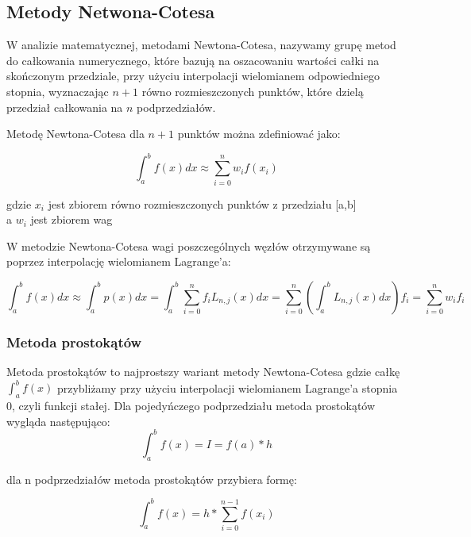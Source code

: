 \documentclass[12pt,twoside]{article}
\begin{document}
\subsection{Metody Netwona-Cotesa}

W analizie matematycznej, metodami Newtona-Cotesa, nazywamy grupę metod do całkowania numerycznego, które bazują na oszacowaniu wartości całki na skończonym przedziale, przy użyciu interpolacji wielomianem odpowiedniego stopnia, wyznaczając $n+1$ równo rozmieszczonych punktów, które dzielą przedział całkowania na $n$ podprzedziałów.
\cite{wikipedia}

Metodę Newtona-Cotesa dla $n+1$ punktów  można zdefiniować jako:

\begin{equation}
\int_a^b f(x)dx \approx \sum_{i=0}^n w_i f(x_i)
\label{Eq:rownanie}
\end{equation}


gdzie 
$x_i$ jest zbiorem równo rozmieszczonych punktów z przedziału [a,b]\\
a $w_i$ jest zbiorem wag


W metodzie Newtona-Cotesa wagi poszczególnych węzłów otrzymywane są poprzez interpolację wielomianem Lagrange'a:

\begin{equation}
\int_a^b f(x) dx \approx \int_a^b p(x) dx = \int_a^b \sum_{i=0}^{n} f_i L_{n,j}(x) dx = \sum_{i=0}^{n}(\int_a^b L_{n,j}(x)dx)f_i = \sum_{i=0}^{n} w_i f_i
\label{Eq:rownanie}
\end{equation}

\cite{web}

\clearpage	

\subsubsection{Metoda prostokątów}

Metoda prostokątów to najprostszy wariant metody Newtona-Cotesa gdzie całkę $\int_a^b f(x)$ przybliżamy przy użyciu interpolacji wielomianem Lagrange'a stopnia 0, czyli funkcji stałej.
Dla pojedyńczego podprzedziału metoda prostokątów wygląda następująco:
\begin{equation}
\int_a^b f(x) = I = f(a)*h
\label{Eq:rownanie}
\end{equation}

dla n podprzedziałów metoda prostokątów przybiera formę:

\begin{equation}
\int_a^b f(x) = h * \sum_{i=0}^{n-1}f(x_i)
\label{Eq:rownanie}
\end{equation}
\end{document}
